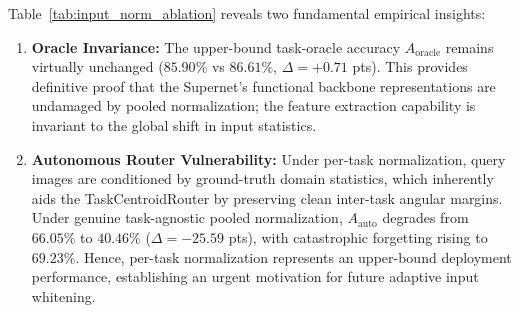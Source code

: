\documentclass[11pt, a4paper]{article}
\begin{document}
\begin{table}[h]
\centering
\caption{\textbf{Impact of Input Normalization on Autonomous vs. Oracle Lifelong Learning (B71 Paired A/B).} Measured across identical seeds and hyperparameters on the production schedule ($5, 28, 16$ epochs, bf16).}
\label{tab:input_norm_ablation}
\small
{}
\end{table}

Table~\ref{tab:input_norm_ablation} reveals two fundamental empirical insights:
\begin{enumerate}
    \item \textbf{Oracle Invariance:} The upper-bound task-oracle accuracy $A_{\text{oracle}}$ remains virtually unchanged ($85.90\%$ vs $86.61\%$, $\Delta = +0.71$ pts). This provides definitive proof that the Supernet's functional backbone representations are undamaged by pooled normalization; the feature extraction capability is invariant to the global shift in input statistics.
    \item \textbf{Autonomous Router Vulnerability:} Under per-task normalization, query images are conditioned by ground-truth domain statistics, which inherently aids the TaskCentroidRouter by preserving clean inter-task angular margins. Under genuine task-agnostic pooled normalization, $A_{\text{auto}}$ degrades from $66.05\%$ to $40.46\%$ ($\Delta = -25.59$ pts), with catastrophic forgetting rising to $69.23\%$. Hence, per-task normalization represents an upper-bound deployment performance, establishing an urgent motivation for future adaptive input whitening.
\end{enumerate}
\end{document}
